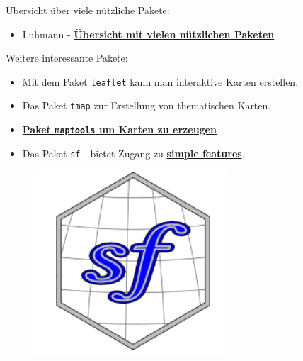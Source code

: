 \documentclass[ignorenonframetext,]{beamer}
\providecommand{\tightlist}{%
  \setlength{\itemsep}{0pt}\setlength{\parskip}{0pt}}
\begin{document}
\begin{frame}[fragile]{Übersicht über viele nützliche Pakete:}

\begin{itemize}
\tightlist
\item
  Luhmann -
  \href{http://www.beltz.de/fileadmin/beltz/downloads/OnlinematerialienPVU/28090_Luhmann/Verwendete\%20Pakete.pdf}{\textbf{Übersicht
  mit vielen nützlichen Paketen}}
\end{itemize}

\begin{block}{Weitere interessante Pakete:}

\begin{itemize}
\tightlist
\item
  Mit dem Paket \texttt{leaflet} kann man interaktive Karten erstellen.
\item
  Das Paket \texttt{tmap} zur Erstellung von thematischen Karten.
\item
  \href{http://www.r-bloggers.com/tag/maptools/}{\textbf{Paket
  \texttt{maptools} um Karten zu erzeugen}}
\item
  Das Paket \texttt{sf} - bietet Zugang zu
  \href{https://de.wikipedia.org/wiki/Simple_Feature_Access}{\textbf{simple
  features}}.
\end{itemize}

\begin{figure}
\centering
\includegraphics{figure/logo_sf.PNG}
\caption{}
\end{figure}

\end{block}

\end{frame}
\end{document}
